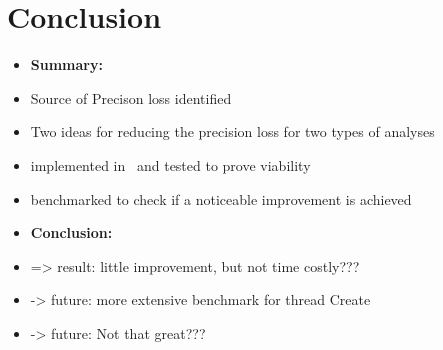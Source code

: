 
\chapter{Conclusion}\label{chapter:conclusion}
\begin{itemize}
  \item \textbf{Summary:}
  \item Source of Precison loss identified
  \item Two ideas for reducing the precision loss for two types of analyses
  \item implemented in \gob\ and tested to prove viability
  \item benchmarked to check if a noticeable improvement is achieved
  \item \textbf{Conclusion:}
  \item => result: little improvement, but not time costly???
  \item -> future: more extensive benchmark for thread Create
  \item -> future: Not that great???
\end{itemize}

